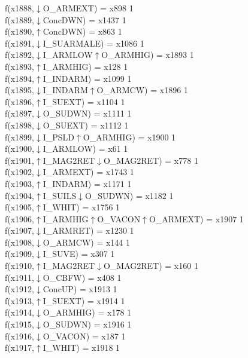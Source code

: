 f(x1888,$\downarrow$O\_ARMEXT) = x898 {1} \\
f(x1889,$\downarrow$ConcDWN) = x1437 {1} \\
f(x1890,$\uparrow$ConcDWN) = x863 {1} \\
f(x1891,$\downarrow$I\_SUARMALE) = x1086 {1} \\
f(x1892,$\downarrow$I\_ARMLOW$\uparrow$O\_ARMHIG) = x1893 {1} \\
f(x1893,$\uparrow$I\_ARMHIG) = x128 {1} \\
f(x1894,$\uparrow$I\_INDARM) = x1099 {1} \\
f(x1895,$\downarrow$I\_INDARM$\uparrow$O\_ARMCW) = x1896 {1} \\
f(x1896,$\uparrow$I\_SUEXT) = x1104 {1} \\
f(x1897,$\downarrow$O\_SUDWN) = x1111 {1} \\
f(x1898,$\downarrow$O\_SUEXT) = x1112 {1} \\
f(x1899,$\downarrow$I\_PSLD$\uparrow$O\_ARMHIG) = x1900 {1} \\
f(x1900,$\downarrow$I\_ARMLOW) = x61 {1} \\
f(x1901,$\uparrow$I\_MAG2RET$\downarrow$O\_MAG2RET) = x778 {1} \\
f(x1902,$\downarrow$I\_ARMEXT) = x1743 {1} \\
f(x1903,$\uparrow$I\_INDARM) = x1171 {1} \\
f(x1904,$\uparrow$I\_SUILS$\downarrow$O\_SUDWN) = x1182 {1} \\
f(x1905,$\uparrow$I\_WHIT) = x1756 {1} \\
f(x1906,$\uparrow$I\_ARMHIG$\uparrow$O\_VACON$\uparrow$O\_ARMEXT) = x1907 {1} \\
f(x1907,$\downarrow$I\_ARMRET) = x1230 {1} \\
f(x1908,$\downarrow$O\_ARMCW) = x144 {1} \\
f(x1909,$\downarrow$I\_SUVE) = x307 {1} \\
f(x1910,$\uparrow$I\_MAG2RET$\downarrow$O\_MAG2RET) = x160 {1} \\
f(x1911,$\downarrow$O\_CBFW) = x408 {1} \\
f(x1912,$\downarrow$ConcUP) = x1913 {1} \\
f(x1913,$\uparrow$I\_SUEXT) = x1914 {1} \\
f(x1914,$\downarrow$O\_ARMHIG) = x178 {1} \\
f(x1915,$\downarrow$O\_SUDWN) = x1916 {1} \\
f(x1916,$\downarrow$O\_VACON) = x187 {1} \\
f(x1917,$\uparrow$I\_WHIT) = x1918 {1} \\
